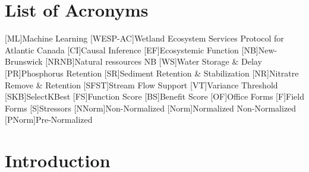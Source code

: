 \documentclass[12pt,letterpaper]{article}
\begin{document}
\section*{List of Acronyms}
\begin{acronym}
[ML]{Machine Learning}
[WESP-AC]{Wetland Ecosystem Services Protocol for Atlantic Canada}
[CI]{Causal Inference}
[EF]{Ecosystemic Function}
[NB]{New-Brunswick}
[NRNB]{Natural ressources NB}
[WS]{Water Storage \& Delay}
[PR]{Phosphorus Retention}
[SR]{Sediment Retention \& Stabilization}
[NR]{Nitratre Remove \& Retention}
[SFST]{Stream Flow Support}
[VT]{Variance Threshold}
[SKB]{SelectKBest}
[FS]{Function Score}
[BS]{Benefit Score}
[OF]{Office Forms}
[F]{Field Forms}
[S]{Stressors}
[NNorm]{Non-Normalized}
[Norm]{Normalized Non-Normalized}
[PNorm]{Pre-Normalized}
\end{acronym}



\section{Introduction}
\end{document}

